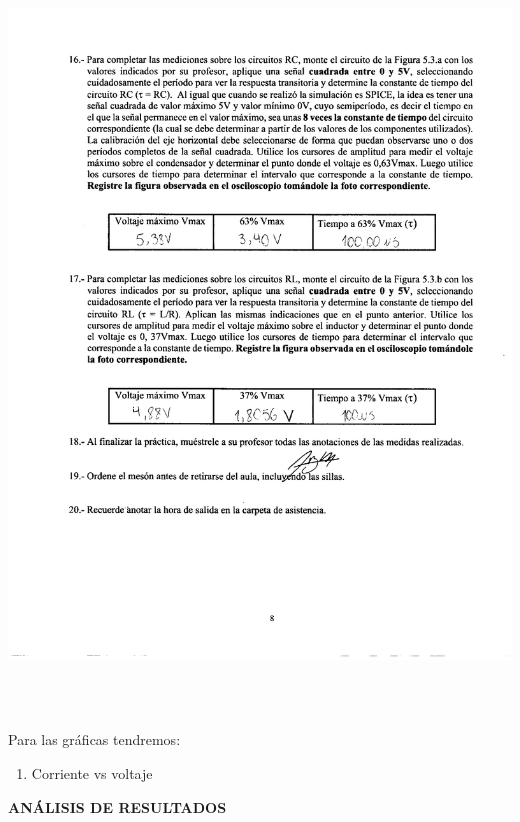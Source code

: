\documentclass[12pt]{article}
\begin{document}
	\begin{center}
		\includegraphics[width=16cm,height=20cm]{Img/anexo_0006}
	\end{center}

	\noindent Para las gráficas tendremos:
	
	
	\renewcommand{\theenumi}{\alph{enumi}} %
	
	\begin{enumerate}
		\item Corriente vs voltaje 
	\end{enumerate}
	
	\newpage
	
	\begin{center}
		\textbf{\large ANÁLISIS DE RESULTADOS}\\
	\end{center}
	
\end{document}
